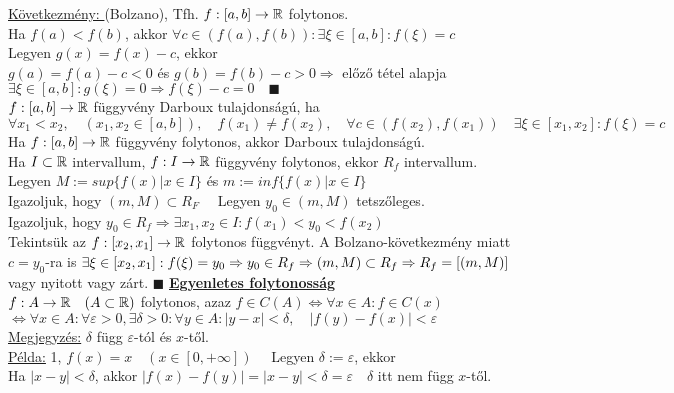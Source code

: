 \documentclass[a4paper,11pt]{article}
\begin{document}
\underline{Következmény: } (Bolzano), Tfh. $f: [a,b]\to\mathbb{R}$ folytonos.\\[0.1cm] Ha $f(a) < f(b)$, akkor $\forall c \in (f(a),f(b)): \exists \xi \in [a,b]: f(\xi) = c$ \\[0.1cm] \biz Legyen $g(x) = f(x) - c$, ekkor \\[0.1cm] $g(a) = f(a) - c < 0$ és $g(b) = f(b) - c > 0 \Rightarrow$ előző tétel alapja \\[0.1cm] $\exists \xi \in [a,b]: g(\xi) = 0 \Rightarrow f(\xi) - c = 0 \quad \blacksquare$\\[0.2cm]
 $f:[a,b]\to\mathbb{R}$ függyvény Darboux tulajdonságú, ha\\ $\forall x_1<x_2,\quad (x_1,x_2\in[a,b]), \quad f(x_1) \neq f(x_2), \quad \forall c \in(f(x_2),f(x_1)) \quad \exists \xi \in [x_1,x_2]: f(\xi) = c$\\[0.2cm]
\tetel Ha $f:[a,b]\to\mathbb{R}$ függyvény folytonos, akkor Darboux tulajdonságú.\\[0.2cm]
\tetel Ha $I\subset\mathbb{R}$ intervallum, $f: I \to\mathbb{R}$ függyvény folytonos, ekkor $R_f$ intervallum.\\[0.2cm]
\biz Legyen $M := sup\{f(x)|x\in I\}$ és $m := inf\{f(x)|x\in I\}$ \\[0.1cm] Igazoljuk, hogy $(m,M)\subset R_F\quad$ Legyen $y_0\in (m,M)$ tetszőleges.\\[0.1cm] Igazoljuk, hogy $y_0\in R_f \Rightarrow \exists x_1,x_2\in I: f(x_1) < y_0 < f(x_2)$ \\[0.1cm] Tekintsük az $f:[x_2,x_1] \to\mathbb{R}$ folytonos függvényt. A Bolzano-következmény miatt\\[0.1cm] $c = y_0$-ra is $\exists\xi\in[x_2,x_1]: f(\xi) = y_0 \Rightarrow y_0 \in R_f \Rightarrow (m,M)\subset R_f\\ \Rightarrow R_f=[(m,M)]$ vagy nyitott vagy zárt. $\blacksquare$
\newpage
{\Large \textbf{\underline{Egyenletes folytonosság}}}\\[0.2cm]
$f: A\to\mathbb{R}\quad (A\subset\mathbb{R})$ folytonos, azaz $f\in C(A)\Leftrightarrow \forall x\in A: f\in C(x)$\\[0.1cm]$\Leftrightarrow\forall x\in A: \forall\varepsilon > 0, \exists\delta > 0: \forall y\in A: |y-x| < \delta , \quad |f(y) - f(x)| < \varepsilon$\\[0.2cm]
\underline{Megjegyzés:} $\delta$ függ $\varepsilon$-tól és $x$-től.\\[0.1cm]
\underline{Példa:} 1, $f(x) = x\quad (x\in[0,+\infty])\quad$ Legyen $\delta := \varepsilon$, ekkor\\ Ha $|x-y| < \delta$, akkor $|f(x) - f(y)| = |x - y| < \delta = \varepsilon\quad\delta$ itt nem függ $x$-től.\\[0.2cm]
\end{document}
